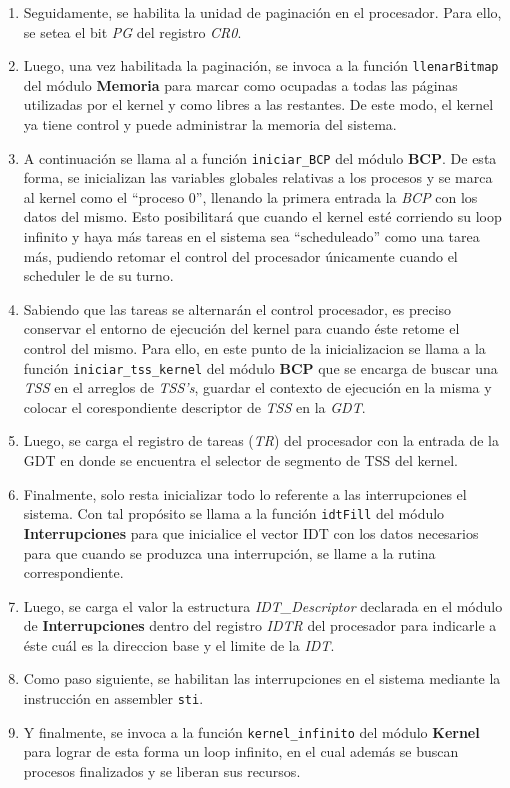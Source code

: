 \documentclass[11pt, a4paper]{article}
\begin{document}
\begin{enumerate}
		\item Seguidamente, se habilita la unidad de paginación en el procesador. Para ello, se setea el bit \textit{PG} del registro \textit{CR0}.
		\item Luego, una vez habilitada la paginación, se invoca a la función \texttt{llenarBitmap} del módulo \textbf{Memoria} para marcar como ocupadas a todas las páginas utilizadas por el kernel y como libres a las restantes. De este modo, el kernel ya tiene control y puede administrar la memoria del sistema.
		\item A continuación se llama al a función \texttt{iniciar\_BCP} del módulo \textbf{BCP}. De esta forma, se inicializan las variables globales relativas a los procesos y se marca al kernel como el ``proceso 0'', llenando la primera entrada la \textit{BCP} con los datos del mismo. Esto posibilitará que cuando el kernel esté corriendo su loop infinito y haya más tareas en el sistema sea ``scheduleado'' como una tarea más, pudiendo retomar el control del procesador únicamente cuando el scheduler le de su turno.
		\item Sabiendo que las tareas se alternarán el control procesador, es preciso conservar el entorno de ejecución del kernel para cuando éste retome el control del mismo. Para ello, en este punto de la inicializacion se llama a la función \texttt{iniciar\_tss\_kernel} del módulo \textbf{BCP} que se encarga de buscar una \textit{TSS} en el arreglos de \textit{TSS's}, guardar el contexto de ejecución en la misma y colocar el corespondiente descriptor de \textit{TSS} en la \textit{GDT}.
		\item Luego, se carga el registro de tareas (\textit{TR}) del procesador con la entrada de la GDT en donde se encuentra el selector de segmento de TSS del kernel.
		\item Finalmente, solo resta inicializar todo lo referente a las interrupciones el sistema. Con tal propósito se llama a la función \texttt{idtFill} del módulo \textbf{Interrupciones} para que inicialice el vector IDT con los datos necesarios para que cuando se produzca una interrupción, se llame a la rutina correspondiente.
		\item Luego, se carga el valor la estructura \textit{IDT\_Descriptor} declarada en el módulo de \textbf{Interrupciones} dentro del registro \textit{IDTR} del procesador para indicarle a éste cuál es la direccion base y el limite de la \textit{IDT}.
		\item Como paso siguiente, se habilitan las interrupciones en el sistema mediante la instrucción en assembler \texttt{sti}. 
		\item Y finalmente, se invoca a la función \texttt{kernel\_infinito} del módulo \textbf{Kernel} para lograr de esta forma un loop infinito, en el cual además se buscan procesos finalizados y se liberan sus recursos.
	\end{enumerate}
\end{document}
